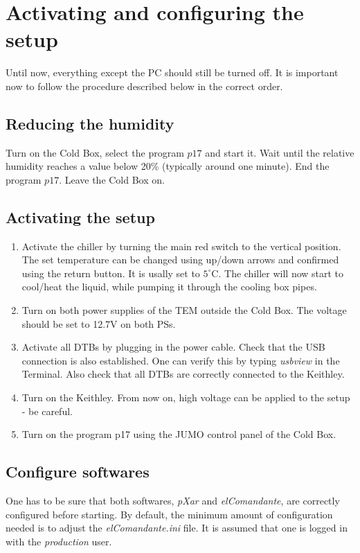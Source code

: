 \documentclass[fleqn,10pt]{SelfArx} %
\begin{document}
\section{Activating and configuring the setup}
Until now, everything except the PC should still be turned off. It is important now to follow the procedure described below in the correct order. 

\subsection{Reducing the humidity}
Turn on the Cold Box, select the program $p17$ and start it. Wait until the relative humidity reaches a value below 20\% (typically around one minute). End the program $p17$. Leave the Cold Box on.

\subsection{Activating the setup}
\begin{enumerate}
\item Activate the chiller by turning the main red switch to the vertical position. The set temperature can be changed using up/down arrows and confirmed using the return button. It is usally set to $5^\circ$C. The chiller will now start to cool/heat the liquid, while pumping it through the cooling box pipes. 
\item Turn on both power supplies of the TEM outside the Cold Box. The voltage should be set to 12.7V on both PSs. 
\item Activate all DTBs by plugging in the power cable. Check that the USB connection is also established. One can verify this by typing {\it usbview} in the Terminal. Also check that all DTBs are correctly connected to the Keithley. 
\item Turn on the Keithley. From now on, high voltage can be applied to the setup - be careful.
\item Turn on the program p17 using the JUMO control panel of the Cold Box. 
\end{enumerate}

\subsection{Configure softwares}
One has to be sure that both softwares, {\it pXar} and {\it elComandante}, are correctly configured before starting. By default, the minimum amount of configuration needed is to adjust the {\it elComandante.ini} file. It is assumed that one is logged in with the {\it production} user.
\end{document}
